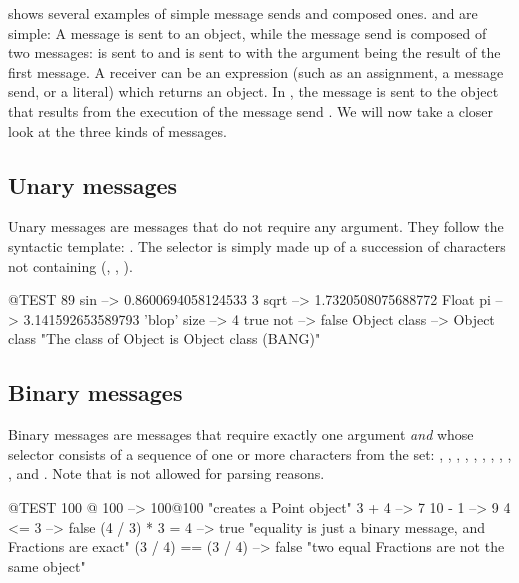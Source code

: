 \documentclass[a4paper,10pt,twoside]{book}
\begin{document}
 shows several examples of simple message sends and composed ones.
 and  are simple:
A message is sent to an object, while the message send  is composed of two messages:
 is sent to  and  is sent to  with the argument being the result of the first message.
A receiver can be an expression (such as an assignment, a message send, or a literal) which returns an object.
In , the message  is sent to the object that results from the execution of the message send .
We will now take a closer look at the three kinds of messages.

\subsection{Unary messages}
Unary messages are messages that do not require any argument.
They follow the syntactic template: .
The selector is simply made up of a succession of characters not containing \ct{:} (\eg {}, , ).
\begin{code}{@TEST}
89 sin           --> 0.8600694058124533
3 sqrt           --> 1.7320508075688772
Float pi         --> 3.141592653589793
'blop' size     --> 4
true not        --> false
Object class --> Object class  "The class of Object is Object class (BANG)"
\end{code}


\subsection{Binary messages} 
Binary messages are messages that require exactly one argument \emph{and} whose selector consists of a sequence of one or more characters from the set: \ct{+}, \ct{-}, \ct{*}, \ct{/}, \ct{&}, \ct{=}, \ct{>}, \ct{|}, \ct{<}, \ct{~}, and .
Note that \ct{--} is not allowed for parsing reasons.

\begin{code}{@TEST}
100 @ 100      --> 100@100  "creates a Point object"
3 + 4              --> 7
10 - 1            --> 9
4 <= 3            --> false
(4 / 3) * 3 = 4   --> true  "equality is just a binary message, and Fractions are exact"
(3 / 4) == (3 / 4) --> false  "two equal Fractions are not the same object"
\end{code}
\end{document}
